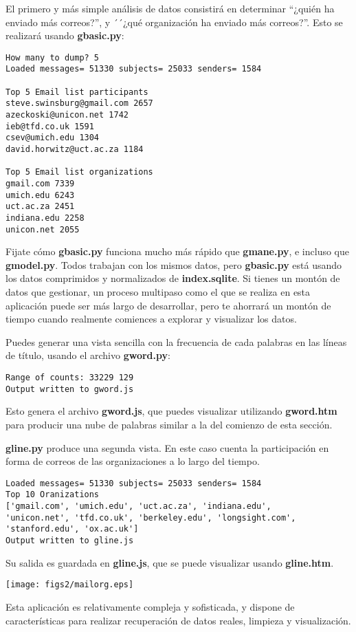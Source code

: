 El primero y más simple análisis de datos consistirá en determinar ``¿quién ha enviado más correos?'',
y ´´¿qué organización ha enviado más correos?''. Esto se realizará usando {\bf gbasic.py}:

\beforeverb
\begin{verbatim}
How many to dump? 5
Loaded messages= 51330 subjects= 25033 senders= 1584

Top 5 Email list participants
steve.swinsburg@gmail.com 2657
azeckoski@unicon.net 1742
ieb@tfd.co.uk 1591
csev@umich.edu 1304
david.horwitz@uct.ac.za 1184

Top 5 Email list organizations
gmail.com 7339
umich.edu 6243
uct.ac.za 2451
indiana.edu 2258
unicon.net 2055
\end{verbatim}
\afterverb
%
Fijate cómo {\bf gbasic.py} funciona mucho más rápido que {\bf gmane.py},
e incluso que {\bf gmodel.py}. Todos trabajan con los mismos datos, pero
{\bf gbasic.py} está usando los datos comprimidos y normalizados de
{\bf index.sqlite}. Si tienes un montón de datos que gestionar, un proceso
multipaso como el que se realiza en esta aplicación puede ser más largo de desarrollar,
pero te ahorrará un montón de tiempo cuando realmente comiences a explorar
y visualizar los datos.

Puedes generar una vista sencilla con la frecuencia de cada palabras en las
líneas de título, usando el archivo {\bf gword.py}:

\beforeverb
\begin{verbatim}
Range of counts: 33229 129
Output written to gword.js
\end{verbatim}
\afterverb
%
Esto genera el archivo {\bf gword.js}, que puedes visualizar utilizando
{\bf gword.htm} para producir una nube de palabras similar a la del comienzo
de esta sección. 

{\bf gline.py} produce una segunda vista. En este caso cuenta la participación
en forma de correos de las organizaciones a lo largo del tiempo.

\beforeverb
\begin{verbatim}
Loaded messages= 51330 subjects= 25033 senders= 1584
Top 10 Oranizations
['gmail.com', 'umich.edu', 'uct.ac.za', 'indiana.edu', 
'unicon.net', 'tfd.co.uk', 'berkeley.edu', 'longsight.com', 
'stanford.edu', 'ox.ac.uk']
Output written to gline.js
\end{verbatim}
\afterverb
%
Su salida es guardada en {\bf gline.js}, que se puede visualizar usando {\bf gline.htm}.

\beforefig
\centerline{\texttt{[image: figs2/mailorg.eps]}}
\afterfig

Esta aplicación es relativamente compleja y sofisticada, y
dispone de características para realizar recuperación de datos reales, limpieza y visualización.
